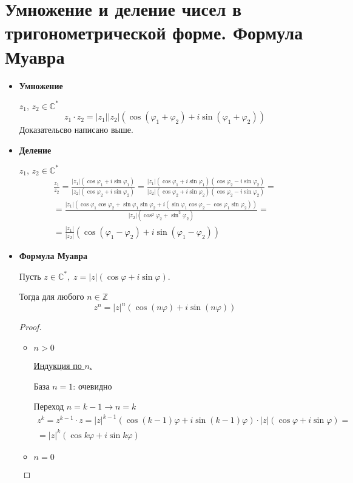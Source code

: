 
\section{Умножение и деление чисел в тригонометрической форме. Формула Муавра}
\begin{itemize}
    \item \textbf{Умножение} 
  
    $z_1,\, z_2 \in \mathbb{C}^*$
    \[ z_1 \cdot z_2 = |z_1||z_2|(\cos(\varphi_1 + \varphi_2) + i\sin(\varphi_1 + \varphi_2)) \]
    Доказательсво написано выше.
    \item \textbf{Деление} 

    $z_1,\, z_2 \in \mathbb{C}^*$
    \begin{gather*}
        \frac{z_1}{z_2} = \frac{|z_1|(\cos\varphi_1 + i\sin\varphi_1)}{|z_2|(\cos\varphi_2 + i\sin\varphi_2)} = \frac{|z_1|(\cos\varphi_1 + i\sin\varphi_1)(\cos\varphi_2 - i\sin\varphi_2)}{|z_2|(\cos\varphi_2 + i\sin\varphi_2)(\cos\varphi_2 - i\sin\varphi_2)} = \\
        = \frac{|z_1|(\cos\varphi_1\cos\varphi_2 + \sin\varphi_1\sin\varphi_2 + i(\sin\varphi_1\cos\varphi_2 - \cos\varphi_1\sin\varphi_2))}{|z_2|(\cos^2\varphi_2 + \sin^2\varphi_2)} = \\
        = \frac{|z_1|}{|z_2|}(\cos(\varphi_1 - \varphi_2) + i\sin(\varphi_1 - \varphi_2))
    \end{gather*}
    \item \textbf{Формула Муавра}
  
    Пусть $z \in \mathbb{C}^*,\; z = |z|(\cos\varphi + i\sin\varphi)$. 

    Тогда для любого $n \in \mathbb{Z}$
    \[ z^n = |z|^n(\cos(n\varphi) + i\sin(n\varphi)) \]
    \begin{proof} \quad
        \begin{itemize}
            \item $n > 0$
      
            \underline{Индукция по $n$.}

            База $n = 1$: очевидно

            Переход $n = k - 1 \to n = k$
            \begin{gather*}
                z^k = z^{k-1} \cdot z = |z|^{k-1}(\cos(k - 1)\varphi + i\sin(k - 1)\varphi) \cdot |z|(\cos\varphi + i\sin\varphi) =  \\
                = |z|^k(\cos k\varphi + i\sin k\varphi)    
            \end{gather*}
            \item $n = 0$
      

\end{itemize}
\end{proof}
\end{itemize}

